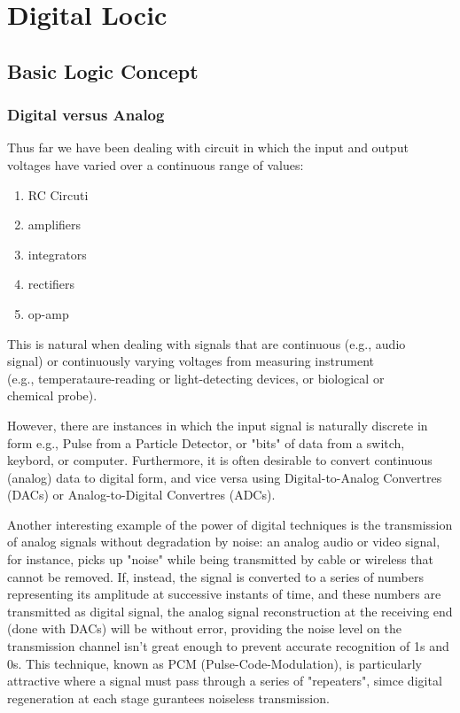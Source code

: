 \newpage
{}
\section{Digital Locic}
\subsection{Basic Logic Concept}
\subsubsection{Digital versus Analog}

Thus far we have been dealing with circuit in which the input and output voltages have varied over a continuous range of values:

\begin{enumerate}[label=(\alph*)]
    \item RC Circuti
    \item amplifiers
    \item integrators
    \item rectifiers
    \item op-amp
\end{enumerate}

\noindent This is natural when dealing with signals that are continuous (e.g., audio\\
 signal) or continuously varying voltages from measuring instrument\\ 
 (e.g., temperataure-reading or light-detecting devices, or biological or\\ chemical probe).

However, there are instances in which the input signal is naturally discrete in form 
e.g., Pulse from a Particle Detector, or "bits" of data from a switch, keybord, or 
computer. Furthermore, it is often desirable to convert continuous (analog) data to digital form, and vice versa using 
Digital-to-Analog Convertres (DACs) or Analog-to-Digital Convertres (ADCs).

Another interesting example of the power of digital techniques is the transmission of analog signals without 
degradation by noise: an analog audio or video signal, for instance, picks up "noise" while being transmitted
by cable or wireless that cannot be removed. If, instead, the signal is converted to a series of numbers
representing its amplitude at successive instants of time, and these numbers are transmitted as digital
signal, the analog signal reconstruction at the receiving end (done with DACs) will be without error, providing
the noise level on the transmission channel isn't great enough to prevent accurate recognition of 1s and 0s.
This technique, known as PCM (Pulse-Code-Modulation), is particularly attractive where a signal must pass 
through a series of "repeaters", simce digital regeneration at each stage gurantees noiseless transmission.

